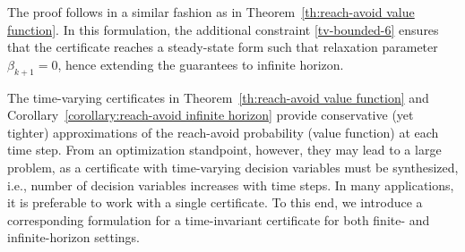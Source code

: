\documentclass[journal,twoside,web]{ieeecolor}
\newcommand{\safe}{\mathrm{s}}
\newcommand{\reach}{\mathrm{r}}
\newcommand{\RA}{\mathcal{R}}
\theoremstyle{definition}
\theoremstyle{plain}
\theoremstyle{plain}
\begin{document}
% 

The proof follows in a similar fashion as in Theorem~\ref{th:reach-avoid value function}. In this formulation, the additional constraint \eqref{tv-bounded-6} ensures that the certificate reaches a steady-state form such that relaxation parameter $\beta_{k+1} = 0$, hence extending the guarantees to infinite horizon.

The time-varying certificates in Theorem~\ref{th:reach-avoid value function} and Corollary~\ref{corollary:reach-avoid infinite horizon} provide conservative (yet tighter) approximations of the reach-avoid probability (value function) at each time step. From an optimization standpoint, however, they may lead to a large problem, as a certificate with time-varying decision variables must be synthesized, i.e., number of decision variables increases with time steps. In many applications, it is preferable to work with a single certificate. To this end, we introduce a corresponding formulation for a time-invariant certificate for both finite- and infinite-horizon settings.

\end{document}
